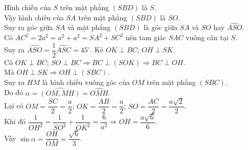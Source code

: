 \begin{ex}
{\begin{itemchoice}
			Hình chiếu của $S$ trên  mặt phẳng $(SBD)$ là $S$. \\
			 Vậy hình chiếu của $SA$ trên mặt phẳng $(SBD)$ là $SO$. \\
			Suy ra góc giữa $SA$ và mặt phẳng $(SBD)$ là góc giữa $SA$ và $SO$ hay $\widehat{ASO}$.  \\
			Có $AC^2=2a^2=a^2+a^2=SA^2+SC^2$  nên tam giác $SAC$ vuông cân tại $S$. \\
			Suy ra  $\widehat{ASO}=\dfrac{1}{2} \widehat{ASC}=45^\circ$.
			\itemch 
			 Kẻ $OK\perp BC$; $OH\perp SK$. \\
			Có $OK\perp BC$; $SO\perp  BC\Rightarrow BC\perp (SOK) \Rightarrow BC\perp OH$. \\
			Mà $OH\perp SK\Rightarrow  OH\perp (SBC)$. \\
			Suy ra $HM$ là hình chiếu vuông góc của $OM$ trên mặt phẳng $(SBC)$. \\ 
			Do đó $\alpha=\widehat{(OM,MH)}=\widehat{OMH}$.  \\
			Lại có $OM=\dfrac{SC}{2}=\dfrac{a}{2}$;  $OK=\dfrac{AB}{2}=\dfrac{a}{2}$; $SO=\dfrac{AC}{2}=\dfrac{a\sqrt{2}}{2}$. \\
			 Khi đó $\dfrac{1}{OH^2}=\dfrac{1}{SO^2}+\dfrac{1}{OK^2}=\dfrac{6}{a^2} \Rightarrow OH=\dfrac{a\sqrt{6}}{6}$. \\
			Vậy $\sin \alpha=\dfrac{OH}{OM}=\dfrac{\sqrt{6}}{3}$. 
		\end{itemchoice}
	} 
\end{ex}

